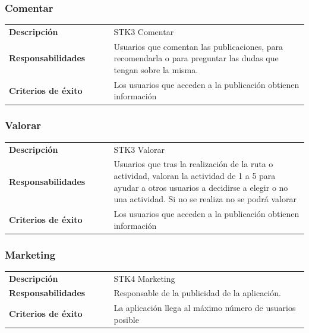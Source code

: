 \documentclass[11pt]{article}
\begin{document}
\subsubsection{Comentar}
\begin{table}[H]
  \centering
  \begin{tabular}{p{0.35\linewidth}|p{0.65\linewidth}}
    \toprule
    \textbf{Descripción} & STK3 Comentar\\
    \textbf{Responsabilidades} & Usuarios que comentan las publicaciones, para recomendarla o para preguntar las dudas que tengan sobre la misma.\\
    \textbf{Criterios de éxito} &  Los usuarios que acceden a la publicación obtienen información\\
    \bottomrule
  \end{tabular}
\end{table}

\subsubsection{Valorar}
\begin{table}[H]
  \centering
  \begin{tabular}{p{0.35\linewidth}|p{0.65\linewidth}}
    \toprule
    \textbf{Descripción} & STK3 Valorar\\
    \textbf{Responsabilidades} & Usuarios que tras la realización de la ruta o actividad, valoran la actividad de 1 a 5 para ayudar a otros usuarios a decidirse a elegir o no una actividad. Si no se realiza no se podrá valorar\\
    \textbf{Criterios de éxito} & Los usuarios que acceden a la publicación obtienen información \\
    \bottomrule
  \end{tabular}
\end{table}

\subsubsection{Marketing}
\begin{table}[H]
  \centering
  \begin{tabular}{p{0.35\linewidth}|p{0.65\linewidth}}
    \toprule
    \textbf{Descripción} & STK4 Marketing\\
    \textbf{Responsabilidades} & Responsable de la publicidad de la aplicación.\\
    \textbf{Criterios de éxito} &  La aplicación llega al máximo número de usuarios posible\\
    \bottomrule
  \end{tabular}
\end{table}
\end{document}
